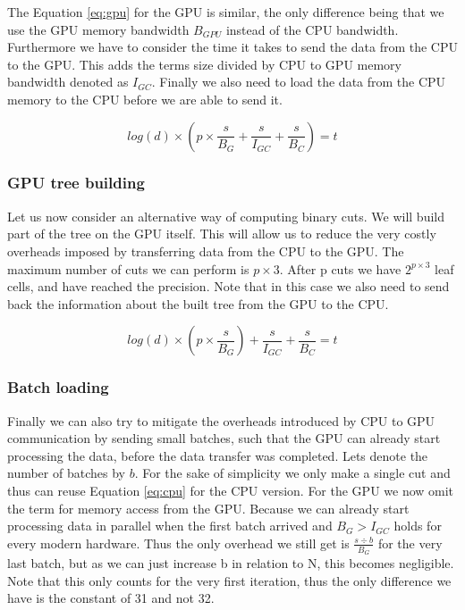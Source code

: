 \documentclass[]{article}
\begin{document}
\vspace{5mm}


The Equation \ref{eq:gpu} for the GPU is similar, the only difference being that we use the GPU memory bandwidth $B_{GPU}$ instead of the CPU bandwidth. Furthermore we have to consider the time it takes to send the data from the CPU to the GPU. This adds the terms size divided by CPU to GPU memory bandwidth denoted as $I_{GC}$. Finally we also need to load the data from the CPU memory to the CPU before we are able to send it. 

\begin{center}
	\begin{equation}
			log(d) \times \left ( p \times \frac{s}{B_{G}} + \frac{s}{I_{GC}}  + \frac{s}{B_{C}} \right ) = t
		\label{eq:gpu}
	\end{equation}
\end{center}

\vspace{5mm}


\subsubsection{GPU tree building}

Let us now consider an alternative way of computing binary cuts. We will build part of the tree on the GPU itself. This will allow us to reduce the very costly overheads imposed by transferring data from the CPU to the GPU. The maximum number of cuts we can perform is $p \times 3$. After p cuts we have $2^{p \times 3}$ leaf cells, and have reached the precision. Note that in this case we also need to send back the information about the built tree from the GPU to the CPU. 

\begin{center}
	\begin{equation}
		log(d) \times \left ( p \times \frac{s}{B_{G}} \right ) + \frac{s}{I_{GC}} + \frac{s}{B_{C}} = t
		\label{eq:gputree}
	\end{equation}
\end{center}


\subsubsection{Batch loading}

Finally we can also try to mitigate the overheads introduced by CPU to GPU communication by sending small batches, such that the GPU can already start processing the data, before the data transfer was completed. Lets denote the number of batches by $b$. For the sake of simplicity we only make a single cut and thus can reuse Equation \ref{eq:cpu} for the CPU version. For the GPU we now omit the term for memory access from the GPU. Because we can already start processing data in parallel when the first batch arrived and $B_{G} > I_{GC}$ holds for every modern hardware. Thus the only overhead we still get is $\frac{s \div b}{B_{G}}$ for the very last batch, but as we can just increase b in relation to N, this becomes negligible. Note that this only counts for the very first iteration, thus the only difference we have is the constant of 31 and not 32. 
\end{document}
